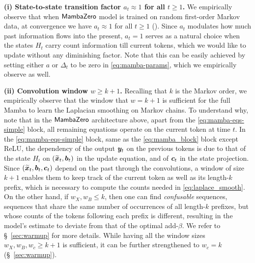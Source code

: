 {\bf (i) State-to-state transition factor $a_t \approx 1$ for all $t \geq 1$.} We empirically observe that when $\mathsf{MambaZero}$ model is trained on random first-order Markov data, at convergence we have $a_t \approx 1$ for all $t\geq1$ (). Since $a_t$ modulates how much past information flows into the present, $a_t=1$ serves as a natural choice when the states $H_t$ carry count information till current tokens, which we would like to update without any diminishing factor. Note that this can be easily achieved by setting either $a$ or $\Delta_t$ to be zero in \ref{eq:mamba-params}, which we empirically observe as well.


{\bf (ii) Convolution window $w \geq k+1$.} Recalling that $k$ is the Markov order, we empirically observe that the window that $w=k+1$ is sufficient for the full Mamba to learn the Laplacian smoothing on \kth Markov chains. To understand why, note that in the $\mathsf{MambaZero}$ architecture above, apart from the \ref{eq:mamba-eqs-simple} block, all remaining equations operate on the current token at time $t$. In the \ref{eq:mamba-eqs-simple} block, same as the \ref{eq:mamba_block} block except ReLU, the dependency of the output $\boldsymbol{y}_t$ on the previous tokens is due to that of the state $H_t$ on $(\widetilde{\boldsymbol{x}}_t, \boldsymbol{b}_t)$ in the update equation, and of $\boldsymbol{c}_t$ in the state projection. Since $(\widetilde{\boldsymbol{x}}_t, \boldsymbol{b}_t, \boldsymbol{c}_t)$ depend on the past through the convolutions, a window of size $k+1$ enables them to keep track of the current token as well as its length-$k$ prefix, which is necessary to compute the counts needed in \ref{eq:laplace_smooth}. On the other hand, if $w_X, w_B \leq k$, then one can find \emph{confusable} sequences, \ie sequences that share the same number of occurrences of all length-$k$ prefixes, but whose counts of the tokens following each prefix is different, resulting in the model's estimate to deviate from that of the optimal add-$\beta$. We refer to \S~\ref{sec:warmup} for more details. While having all the window sizes $w_X, w_B, w_c \geq k+1$ is sufficient, it can be further strengthened to $w_c = k$ (\S~\ref{sec:warmup}).

